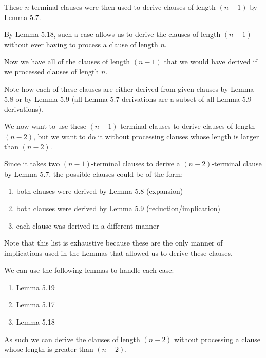 \documentclass[manuscript]{acmart}
\begin{document}
    These $n$-terminal clauses were then used to derive clauses of length $(n - 1)$
    by Lemma 5.7.

    By Lemma 5.18, such a case allows us to derive the clauses of length $(n - 1)$
    without ever having to process a clause of length $n$.

    Now we have all of the clauses of length $(n - 1)$ that we would have derived
    if we processed clauses of length $n$.

    Note how each of these clauses are either derived from given clauses
    by Lemma 5.8 or by Lemma 5.9 (all Lemma 5.7 derivations are a subset
    of all Lemma 5.9 derivations).

    We now want to use these $(n-1)$-terminal clauses to derive clauses
    of length $(n-2)$, but we want to do it without processing clauses
    whose length is larger than $(n-2)$.

    Since it takes two $(n-1)$-terminal clauses to derive a $(n-2)$-terminal
    clause by Lemma 5.7, the possible clauses could be of the form:

    \begin{enumerate}
        \item both clauses were derived by Lemma 5.8 (expansion)
        \item both clauses were derived by Lemma 5.9 (reduction/implication)
        \item each clause was derived in a different manner
    \end{enumerate}

    Note that this list is exhaustive because these are the only manner
    of implications used in the Lemmas that allowed us to derive these clauses.

    We can use the following lemmas to handle each case:

    \begin{enumerate}
        \item Lemma 5.19
        \item Lemma 5.17
        \item Lemma 5.18
    \end{enumerate}

    As such we can derive the clauses of length $(n - 2)$ without processing
    a clause whose length is greater than $(n - 2)$.
\end{document}
